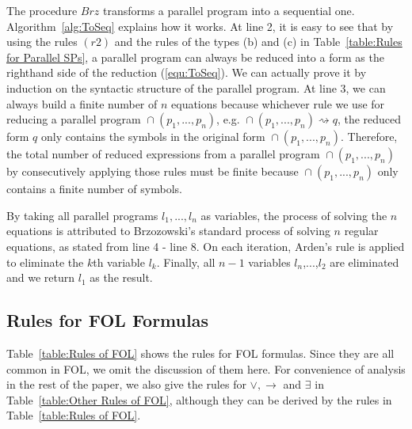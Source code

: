 \documentclass{fcs}
\DeclareMathOperator{\para}{\cap}
\newcommand{\red}[0]{\rightsquigarrow}
\newcommand{\ToSeq}[0]{\mathit{Brz}}
\begin{document}
    The procedure $\ToSeq$ transforms a parallel program into a sequential one.
    Algorithm~\ref{alg:ToSeq} explains how it works.
    At line 2, it is easy to see that by using the rules $(r2)$ and the rules of the types (b) and (c) in Table~\ref{table:Rules for Parallel SPs},
    a parallel program can always be reduced into a form as the righthand side of the reduction (\ref{equ:ToSeq}).
    We can actually prove it by induction on the syntactic structure of the parallel program.
    At line 3, we can always build a finite number of $n$ equations because whichever rule we use for reducing a parallel program $\para(p_1,...,p_n)$, e.g. $\para(p_1,...,p_n)\red q$,
    the reduced form $q$ only contains the symbols in the original form $\para(p_1,...,p_n)$.
    Therefore, the total number of reduced expressions from a parallel program $\para(p_1,...,p_n)$ by consecutively applying those rules must be finite because $\para(p_1,...,p_n)$ only contains a finite number of symbols.

    By taking all parallel programs $l_1,...,l_n$ as variables, the process of solving the $n$ equations is attributed to Brzozowski's standard process of solving $n$ regular equations,
    as stated from line 4 - line 8.
    On each iteration, Arden's rule is applied to eliminate the $k$th variable $l_k$.
    Finally, all $n-1$ variables $l_{n}$,...,$l_2$ are eliminated and we return $l_1$ as the result.



\subsection{Rules for FOL Formulas}
\label{section:Rules for FOL formulas}

Table~\ref{table:Rules of FOL} shows the rules for FOL formulas.
Since they are all common in FOL, we omit the discussion of them here.
For convenience of analysis in the rest of the paper, we also give the rules for $\vee, \to$ and $\exists$ in Table~\ref{table:Other Rules of FOL}, although they can be derived by the rules in Table~\ref{table:Rules of FOL}.
\end{document}
